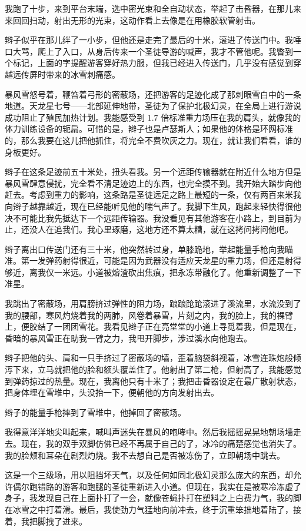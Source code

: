 \documentclass[AutoFakeBold=true]{book}
\begin{document}
我跑了十步，来到平台末端，选中密光束和全自动状态，举起了击昏器，在那儿来来回回扫动，射出无形的光束，这动作看上去像是在用橡胶软管射击。

辫子似乎在那儿绊了一小步，但他还是走完了最后的十米，滚进了传送门中。我唾口大骂，爬上了入口，从身后传来一个圣徒导游的喊声，我才不管他呢。我瞥到一个标记，上面的字提醒游客穿好热力服，但我已经进入传送门，几乎没有感觉到穿越远传屏时带来的冰雪刺痛感。

暴风雪怒号着，鞭笞着弓形的密蔽场，还把游客的足迹化成了那刺眼雪白中的一条地道。天龙星七号——北部延伸地带，圣徒为了保护北极幻灵，在全局上进行游说成功阻止了殖民加热计划。我能感受到 1.7 倍标准重力场压在我的肩头，就像我的体力训练设备的轭扁。可惜的是，辫子也是卢瑟斯人；如果他的体格是环网标准的，那么我要在这儿把他抓住，将完全不费吹灰之力。现在，就让我们看看，谁的身板更好。

辫子在这条足迹前五十米处，扭头看我。另一个远距传输器就在附近什么地方但是暴风雪肆意侵扰，完全看不清足迹边上的东西，也完全摸不到。我开始大踏步向他赶去。考虑到重力的影响，这条路是圣徒远足之路上最短的一条，仅有两百来米我向辫子越靠越近，现在已经能听见他的喘气声了。我脚下生风，跑起来轻快得很他决不可能比我先抵达下一个远距传输器。我没看见有其他游客在小路上，到目前为止，还没人在追我们。我心里琢磨，这地方还不算太糟，就在这拷问拷问他吧。

辫子离出口传送门还有三十米，他突然转过身，单膝跪地，举起能量手枪向我瞄准。第一发弹药射得很近，可能是因为武器没有适应天龙星的重力场，但还是射得够近，离我仅一米远。小道被熔渣砍出焦痕，把永冻带融化了。他重新调整了一下准星。

我跳出了密蔽场，用肩膀挤过弹性的阻力场，踉踉跄跄滚进了溪流里，水流没到了我的腰部，寒风灼烧着我的两肺，风卷着暴雪，片刻之内，我的脸上，我的裸臂上，便胶结了一团团雪花。我看见辫子正在亮堂堂的小道上寻觅着我，但是现在，昏暗的暴风雪正在助我一臂之力，我甩开脚步，涉过溪水向他跑去。

辫子把他的头、肩和一只手挤过了密蔽场的墙，歪着脑袋斜视着，冰雪连珠炮般倾泻下来，立马就把他的脸和额头覆盖住了。他射出了第二枪，但射高了，我能感觉到弹药掠过的热量。现在，我离他只有十米了；我把击昏器设定在最广散射状态，把身体埋在雪堆中，头没抬一下，便朝他的方向发射出去。

辫子的能量手枪摔到了雪堆中，他掉回了密蔽场。

我得意洋洋地尖叫起来，喊叫声迷失在暴风的咆哮中。然后我摇摇晃晃地朝场墙走去。现在，我的双手双脚仿佛已经不再属于自己的了，冰冷的痛楚感觉也消失了。我的脸颊和耳朵在剧烈灼烧。我不去想自己是否被冻伤了，立即朝场中跳去。

这是一个三级场，用以阻挡坏天气，以及任何如同北极幻灵那么庞大的东西，却允许偶尔跑错路的游客和跑腿的圣徒重新进入小道。但现在，我实在是被寒冷冻虚了身子，我发现自己在上面扑打了一会，就像苍蝇扑打在塑料之上白费力气，我的脚在冰雪之中打着滑。最后，我使劲力气猛地向前冲去，终于沉重笨拙地着陆了，接着，我把脚拽了进来。
\end{document}
